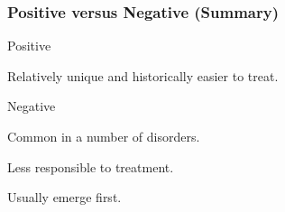\subsubsection{Positive versus Negative (Summary)}

\begin{coloredlist}
    \item Positive
    \begin{coloredlist}
        \item Relatively unique and historically easier to treat.
    \end{coloredlist}
    \item Negative
    \begin{coloredlist}
        \item Common in a number of disorders.
        \item Less responsible to treatment.
        \item Usually emerge first.
    \end{coloredlist}
\end{coloredlist}